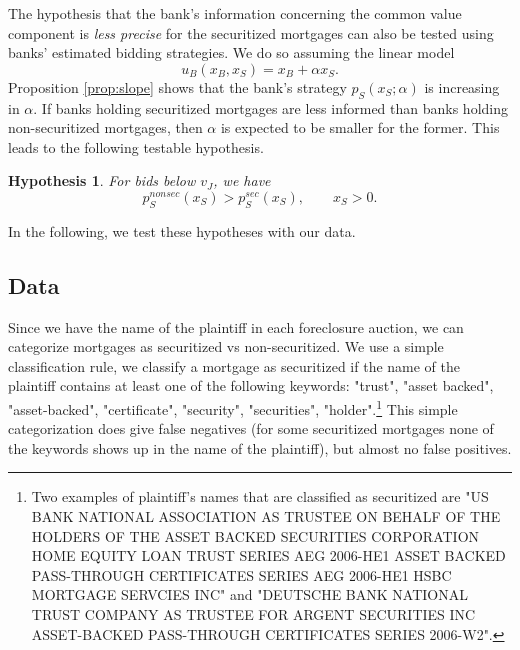 \documentclass[11pt,twopage]{article}
\newtheorem{conjecture}{Hypothesis}
{\bf}{\it}
\begin{document}
The hypothesis that the bank's information concerning the common value component is \emph{less precise} for the securitized mortgages can also be tested using banks' estimated bidding strategies. We do so assuming the linear model 
\[
u_B(x_B,x_S) = x_B+\alpha x_S .
\] 
Proposition \ref{prop:slope} shows that the bank's strategy $p_S(x_S;\alpha)$ is increasing in $\alpha$. 
If banks holding securitized mortgages are less informed than banks holding non-securitized mortgages, then $\alpha$ is expected to be smaller for the former. This leads to the following testable hypothesis.
%


\begin{conjecture}\label{hyp:slope}
	For bids below $v_J$, we have \[ p_S^{nonsec}(x_S) > p_S^{sec}(x_S), \quad\quad x_S>0 .\] \end{conjecture}

In the following, we test these hypotheses with our data.

%

\subsection{Data}

Since we have the name of the plaintiff in each foreclosure auction,
we can categorize mortgages as securitized vs non-securitized. We use
a simple classification rule, we classify a mortgage as securitized if
the name of the plaintiff contains at least one of the following
keywords: "trust", "asset backed", "asset-backed",
"certificate", "security", "securities", "holder".\footnote{Two examples of plaintiff's names that are classified as securitized are "US BANK NATIONAL ASSOCIATION AS TRUSTEE ON BEHALF OF THE HOLDERS OF THE ASSET BACKED SECURITIES CORPORATION HOME EQUITY LOAN TRUST SERIES AEG 2006-HE1 ASSET BACKED PASS-THROUGH CERTIFICATES SERIES AEG 2006-HE1
	HSBC MORTGAGE SERVCIES INC" and "DEUTSCHE BANK NATIONAL TRUST COMPANY AS TRUSTEE FOR ARGENT SECURITIES INC ASSET-BACKED PASS-THROUGH CERTIFICATES SERIES 2006-W2".} This simple
categorization does give false negatives (for some securitized
mortgages none of the keywords shows up in the name of the plaintiff),
but almost no false positives.
\end{document}
